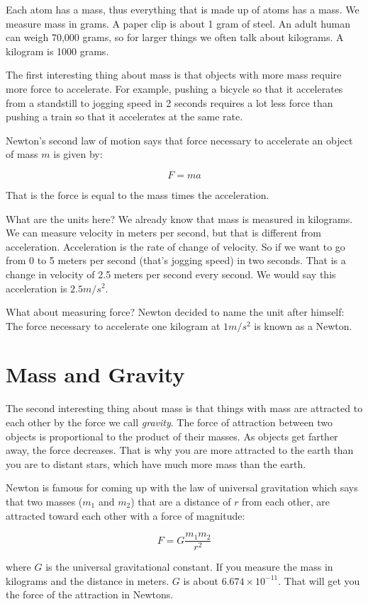 Each atom has a mass, thus everything that is made up of atoms has a
mass.  We measure mass in grams.  A paper clip is about 1 gram of
steel. An adult human can weigh 70,000 grams, so for larger things we
often talk about kilograms. A kilogram is 1000 grams.

The first interesting thing about mass is that objects with more mass
require more force to accelerate. For example, pushing a bicycle so
that it accelerates from a standstill to jogging speed in 2 seconds
requires a lot less force than pushing a train so that it accelerates
at the same rate.

Newton's second law of motion says that force necessary to accelerate
an object of mass $m$ is given by:

$$F = m a$$

That is the force is equal to the mass times the acceleration.

What are the units here? We already know that mass is measured in
kilograms. We can measure velocity in meters per second, but that is
different from acceleration. Acceleration is the rate of change of
velocity. So if we want to go from 0 to 5 meters per second (that's
jogging speed) in two seconds. That is a change in velocity of 2.5
meters per second every second. We would say this acceleration is $2.5
m/s^2$.

What about measuring force? Newton decided to name the unit after
himself: The force necessary to accelerate one kilogram at $1 m/s^2$
is known as a Newton.

\section{Mass and Gravity}

The second interesting thing about mass is that things with mass are
attracted to each other by the force we call \textit{gravity}. The
force of attraction between two objects is proportional to the product
of their masses. As objects get farther away, the force decreases.
That is why you are more attracted to the earth than you are to
distant stars, which have much more mass than the earth.

Newton is famous for coming up with the law of universal gravitation
which says that two masses ($m_1$ and $m_2$) that are a distance of
$r$ from each other, are attracted toward each other with a force of
magnitude:

$$F = G\frac{m_1 m_2}{r^2}$$

where $G$ is the universal gravitational constant. If you measure the
mass in kilograms and the distance in meters. $G$ is about $6.674
\times 10^{-11}$.  That will get you the force of the attraction in
Newtons.

